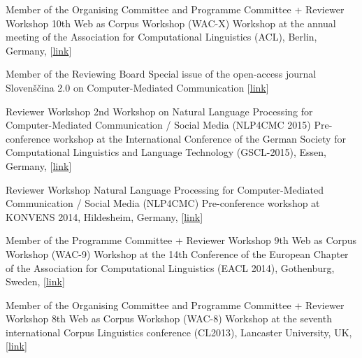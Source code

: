         {Member of the Organising Committee and Programme Committee + Reviewer}
        {Workshop}
        {10th Web as Corpus Workshop (WAC-X)}
        {Workshop at the annual meeting of the Association for Computational
        Linguistics (ACL), Berlin, Germany,
        [\href{https://www.sigwac.org.uk/wiki/WAC-X}{link}]}
        {}

        {Member of the Reviewing Board} 
        {Special issue of the open-access
         journal Slovenščina 2.0 on Computer-Mediated Communication}
        {} 
        {[\href{http://www.trojina.org/slovenscina2.0/en/}{link}]}
        {}

        {Reviewer}
        {Workshop}
        {2nd Workshop on Natural Language Processing for Computer-Mediated Communication /
        Social Media (NLP4CMC 2015)}
        {Pre-conference workshop at the International Conference of the German
        Society for Computational Linguistics and Language Technology
        (GSCL-2015), Essen, Germany, [\href{https://sites.google.com/site/nlp4cmc2015/}{link}]}
        {}

        {Reviewer}
        {Workshop}
        {Natural Language Processing for Computer-Mediated Communication /
        Social Media (NLP4CMC)}
        {Pre-conference workshop at KONVENS 2014, Hildesheim, Germany,
        [\href{https://sites.google.com/site/nlp4cmc/}{link}]}
        {}

        {Member of the Programme Committee + Reviewer}
        {Workshop}
        {9th Web as Corpus Workshop (WAC-9)}
        {Workshop at the 14th Conference of the European Chapter of the
        Association for Computational Linguistics (EACL 2014), Gothenburg,
        Sweden, [\href{https://sigwac.org.uk/wiki/WAC9}{link}]}
        {}

        {Member of the Organising Committee and Programme Committee + Reviewer}
        {Workshop}
        {8th Web as Corpus Workshop (WAC-8)}
        {Workshop at the seventh international Corpus Linguistics
        conference (CL2013), Lancaster University, UK,
        [\href{https://sigwac.org.uk/wiki/WAC8}{link}]}
        {}




